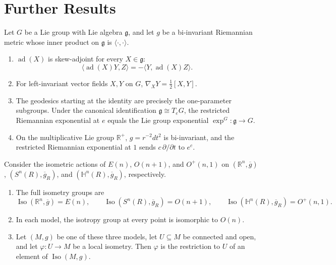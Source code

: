 \section{Further Results}

\begin{proposition}
\label{prop:lie-group-bi-invariant-metric}

Let $G$ be a Lie group with Lie algebra $\mathfrak g$, and let $g$ be a
bi-invariant Riemannian metric whose inner product on $\mathfrak g$ is
$\langle\cdot,\cdot\rangle$.
\begin{enumerate}
\item[(a)] $\operatorname{ad}(X)$ is skew-adjoint for every
$X\in\mathfrak g$:
\[
\langle\operatorname{ad}(X)Y,Z\rangle
=-\langle Y,\operatorname{ad}(X)Z\rangle.
\]
\item[(b)] For left-invariant vector fields $X,Y$ on $G$,
$\nabla_XY=\frac12[X,Y]$.
\item[(c)] The geodesics starting at the identity are precisely the
one-parameter subgroups. Under the canonical identification
$\mathfrak g\cong T_eG$, the restricted Riemannian exponential at $e$ equals
the Lie group exponential $\exp^G:\mathfrak g\to G$.
\item[(d)] On the multiplicative Lie group $\mathbb R^+$,
$g=r^{-2}dt^2$ is bi-invariant, and the restricted Riemannian exponential
at $1$ sends $c\,\partial/\partial t$ to $e^c$.
\end{enumerate}
\end{proposition}

\begin{proposition}
\label{prop:model-manifolds-isometric-actions}

Consider the isometric actions of $E(n)$, $O(n+1)$, and $O^+(n,1)$ on
$(\mathbb R^n,\overline g)$, $(S^n(R),\overline g_R)$, and
$(\mathbb H^n(R),\overline g_R)$, respectively.
\begin{enumerate}
\item[(a)] The full isometry groups are
\[
\operatorname{Iso}(\mathbb R^n,\overline g)=E(n),\qquad
\operatorname{Iso}(S^n(R),\overline g_R)=O(n+1),\qquad
\operatorname{Iso}(\mathbb H^n(R),\overline g_R)=O^+(n,1).
\]
\item[(b)] In each model, the isotropy group at every point is
isomorphic to $O(n)$.
\item[(c)] Let $(M,g)$ be one of these three models, let $U\subseteq M$ be
connected and open, and let $\varphi:U\to M$ be a local isometry. Then
$\varphi$ is the restriction to $U$ of an element of
$\operatorname{Iso}(M,g)$.
\end{enumerate}
\end{proposition}

